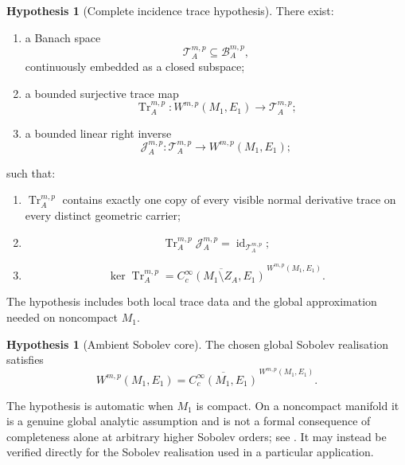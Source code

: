 \documentclass[11pt]{article}
\theoremstyle{plain}
\theoremstyle{definition}
\newtheorem{hypothesis}[theorem]{Hypothesis}
\begin{document}
\begin{hypothesis}[Complete incidence trace hypothesis]
\label{hyp:complete-incidence-trace}
There exist:

\begin{enumerate}[label=\textup{(\roman*)}]
  \item a Banach space
        \[
          \mathcal T_A^{m,p}
          \subseteq
          \mathcal B_A^{m,p},
        \]
        continuously embedded as a closed subspace;

  \item a bounded surjective trace map
        \[
          \operatorname{Tr}_A^{m,p}:
          W^{m,p}(M_1,E_1)
          \longrightarrow
          \mathcal T_A^{m,p};
        \]

  \item a bounded linear right inverse
        \[
          \mathcal J_A^{m,p}:
          \mathcal T_A^{m,p}
          \longrightarrow
          W^{m,p}(M_1,E_1);
        \]
\end{enumerate}
such that:

\begin{enumerate}[label=\textup{(\alph*)}]
  \item \(\operatorname{Tr}_A^{m,p}\) contains exactly one copy of
        every visible normal derivative trace on every distinct
        geometric carrier;

  \item
        \[
          \operatorname{Tr}_A^{m,p}
          \mathcal J_A^{m,p}
          =
          \operatorname{id}_{\mathcal T_A^{m,p}};
        \]

  \item
        \[
          \ker\operatorname{Tr}_A^{m,p}
          =
          \overline{
            C_c^\infty(M_1\setminus Z_A,E_1)
          }^{\,W^{m,p}(M_1,E_1)}.
        \]
\end{enumerate}
\end{hypothesis}

The hypothesis includes both local trace data and the global approximation needed on noncompact \(M_1\).

\begin{hypothesis}[Ambient Sobolev core]
\label{hyp:ambient-sobolev-core}
The chosen global Sobolev realisation satisfies
\[
  W^{m,p}(M_1,E_1)
  =
  \overline{
    C_c^\infty(M_1,E_1)
  }^{\,W^{m,p}(M_1,E_1)}.
\]
\end{hypothesis}

The hypothesis is automatic when \(M_1\) is compact. On a noncompact
manifold it is a genuine global analytic assumption and is not a
formal consequence of completeness alone at arbitrary higher Sobolev
orders; see \citep{HondaMariRimoldiVeronelli2021}. It may instead be
verified directly for the Sobolev realisation used in a particular
application.
\end{document}
